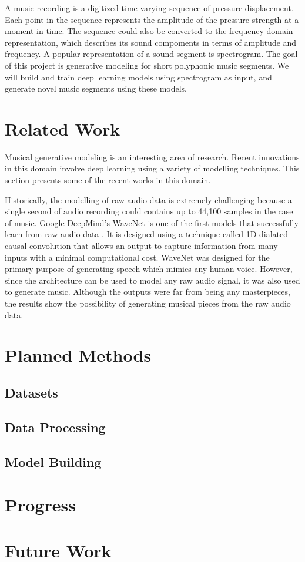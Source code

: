\documentclass[sigconf,authorversion]{acmart}
\begin{document}
A music recording is a digitized time-varying sequence of pressure displacement. Each point in the 
sequence represents the amplitude of the pressure strength at a moment in time. The sequence could 
also be converted to the frequency-domain representation, which describes its sound compoments in terms 
of amplitude and frequency. A popular representation of a sound segment is spectrogram. The goal of this 
project is generative modeling for short polyphonic music segments. We will build and train deep learning 
models using spectrogram as input, and generate novel music segments using these models.

\section{Related Work}

Musical generative modeling is an interesting area of research. Recent innovations in this domain involve
deep learning using a variety of modelling techniques. This section presents some of the recent works in
this domain.

Historically, the modelling of raw audio data is extremely challenging because a single second of audio recording
could contains up to 44,100 samples in the case of music. Google DeepMind's WaveNet is one of the first models
that successfully learn from raw audio data \cite{oord_wavenet_2016}. It is designed using a technique called 
1D dialated causal convolution that allows an output to capture information from many inputs with a minimal
computational cost. WaveNet was designed for the primary purpose of generating speech which mimics any human voice.
However, since the architecture can be used to model any raw audio signal, it was also used to generate music.
Although the outputs were far from being any masterpieces, the results show the possibility of generating musical
pieces from the raw audio data.




\section{Planned Methods}

\subsection{Datasets}


\subsection{Data Processing}


\subsection{Model Building}

\section{Progress}


\section{Future Work}



\end{document}
